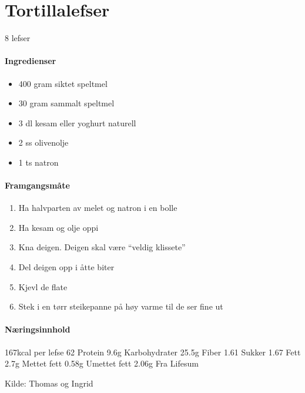 \section{Tortillalefser}
\label{tortillalefser}
8 lefser

\paragraph{Ingredienser}
\begin{itemize}[noitemsep]
	\item 400 gram siktet speltmel
	\item 30 gram sammalt speltmel
	\item 3 dl kesam eller yoghurt naturell
	\item 2 ss olivenolje
	\item 1 ts natron
\end{itemize}

\paragraph{Framgangsmåte}
\begin{enumerate}[noitemsep]
	\item Ha halvparten av melet og natron i en bolle
	\item Ha kesam og olje oppi
	\item Kna deigen. Deigen skal være “veldig klissete”
	\item Del deigen opp i åtte biter
	\item Kjevl de flate
	\item Stek i en tørr steikepanne på høy varme til de ser fine ut
\end{enumerate}

\paragraph{Næringsinnhold}
167kcal per lefse
62%
Protein 9.6g
Karbohydrater 25.5g
	Fiber 1.61
	Sukker 1.67
Fett 2.7g
	Mettet fett 0.58g
	Umettet fett 2.06g
Fra Lifesum

Kilde: Thomas og Ingrid
